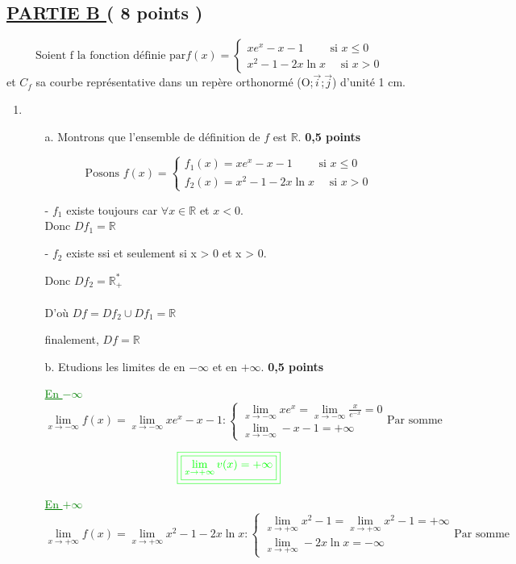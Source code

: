 \documentclass[12pt]{article}
\begin{document}
\subsection*{ \underline{PARTIE B } ( 8 points ) }
\[
\text{Soient f la fonction définie par} 
f(x)=
\begin{cases}
xe^{x}-x-1 \quad\quad  \text{ si }  x \leq 0\\
x^{2}-1-2x\ln x \quad \text{ si } x > 0 
\end{cases}
\]
et $C_{f}$ sa courbe représentative dans un repère orthonormé (O;$\vec{i}$;$\vec{j}$) d'unité 1 cm.
\begin{enumerate}
\item
\begin{enumerate}
\item[a.] Montrons que l'ensemble de définition de $f$ est $\mathbb{R}$.\textbf{ 0,5 points}

\[
\text{Posons } 
f(x)=
\begin{cases}
f_{1}(x)=xe^{x}-x-1 \quad\quad  \text{ si }  x \leq 0\\
f_{2}(x)=x^{2}-1-2x\ln x \quad \text{ si } x > 0 
\end{cases}
\]
\item[-] $f_{1}$ existe toujours car $\forall x\in\mathbb{R}$ et $x<0$. \\

Donc $Df_{1}=\mathbb{R}$

\item[-] $f_{2}$ existe ssi et seulement si x > 0 et x > 0.

Donc $Df_{2}=\mathbb{R}_{+}^{*}$
\\\\
D'où $Df=Df_{2}\cup Df_{1}=\mathbb{R}$

finalement, $Df=\mathbb{R}$
\item[b.] Etudions les limites de en $-\infty$ et en $+\infty$.\textbf{ 0,5 points}

\textcolor{green}{\underline{En $-\infty$}}
\[
\lim_{x \to -\infty}f(x)=\lim_{x \to -\infty}xe^{x}-x-1 : 
\begin{cases}
\lim_{x \to -\infty}xe^{x}=\lim_{x \to -\infty}\frac{x}{e^{-x}}=0\\
\lim_{x \to -\infty}-x-1=+\infty
\end{cases}
\text{Par somme}
\]

\[\textcolor{green}{\boxed{\textcolor{green}{\boxed{\lim_{x\to +\infty}v(x)=+\infty}}}}\]

\textcolor{green}{\underline{En $+\infty$}}
\[
\lim_{x \to +\infty}f(x)=\lim_{x \to +\infty}x^{2}-1-2x\ln x : 
\begin{cases}
\lim_{x \to +\infty}x^{2}-1=\lim_{x \to +\infty}x^{2}-1=+\infty\\
\lim_{x \to +\infty}-2x\ln x=-\infty
\end{cases}
\text{Par somme}
\]


\end{enumerate}
\end{enumerate}
\end{document}
